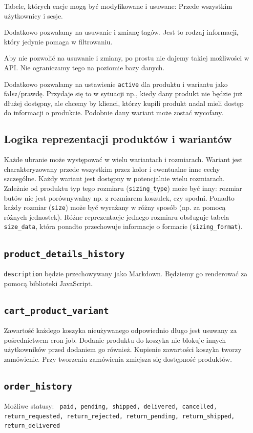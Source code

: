 Tabele, których encje mogą być modyfikowane i usuwane: Przede wszystkim użytkownicy i sesje.

Dodatkowo pozwalamy na usuwanie i zmianę tagów. Jest to rodzaj informacji, który jedynie pomaga w filtrowaniu.

Aby nie pozwolić na usuwanie i zmiany, po prostu nie dajemy takiej możliwości w API. Nie ograniczamy tego na poziomie bazy danych.

Dodatkowo pozwalamy na ustawienie \texttt{active} dla produktu i wariantu jako fałsz/prawdę. Przydaje się to w sytuacji np., kiedy dany produkt nie będzie już dłużej dostępny, ale chcemy by klienci, którzy kupili produkt nadal mieli dostęp do informacji o produkcie. Podobnie dany wariant może zostać wycofany.

\subsection*{Logika reprezentacji produktów i wariantów}
Każde ubranie może występować w wielu wariantach i rozmiarach. Wariant jest charakteryzowany przede wszystkim przez kolor i ewentualne inne cechy szczególne. Każdy wariant jest dostępny w potencjalnie wielu rozmiarach. Zależnie od produktu typ tego rozmiaru (\texttt{sizing\_type}) może być inny: rozmiar butów nie jest porównywalny np. z rozmiarem koszulek, czy spodni. Ponadto każdy rozmiar (\texttt{size}) może być wyrażany w różny sposób (np. za pomocą różnych jednostek). Różne reprezentacje jednego rozmiaru obsługuje tabela \texttt{size\_data}, która ponadto przechowuje informacje o formacie (\texttt{sizing\_format}).

\subsection*{\texttt{product\_details\_history}}
\texttt{description} będzie przechowywany jako Markdown. Będziemy go renderować za pomocą biblioteki JavaScript.

\subsection*{\texttt{cart\_product\_variant}}
Zawartość każdego koszyka nieużywanego odpowiednio długo jest usuwany za pośrednictwem cron job. Dodanie produktu do koszyka nie blokuje innych użytkowników przed dodaniem go również. Kupienie zawartości koszyka tworzy zamówienie. Przy tworzeniu zamówienia zmiejsza się dostępność produktów.

\subsection*{\texttt{order\_history}}
Możliwe statusy:
\texttt{
    paid, pending, shipped, delivered, cancelled,
    return\_requested, return\_rejected, return\_pending,
    return\_shipped, return\_delivered
}

